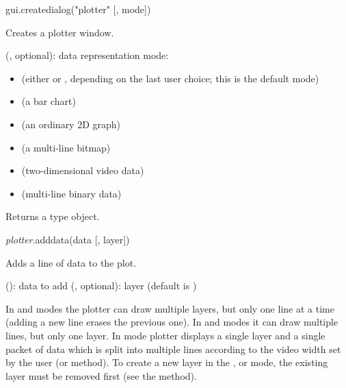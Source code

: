\documentclass[a4paper,12pt,twoside,extrafontsizes]{memoir}
\begin{document}

\begin{luafuncprototype}
gui.createdialog("plotter" [, mode])
\end{luafuncprototype}

\begin{funcdescr}
	Creates a plotter window.
\end{funcdescr}

\begin{funcparams}
	 (, optional): data representation mode:
	\begin{itemize}
		\item {} (either  or , depending on the last user choice; this is the default mode)
		\item {} (a bar chart)
		\item {} (an ordinary 2D graph)
		\item {} (a multi-line bitmap)
		\item {} (two-dimensional video data)
		\item {} (multi-line binary data)
	\end{itemize}
\end{funcparams}

\begin{funcret}
	Returns a  type object.
\end{funcret}


\begin{luafuncprototype}
\emph{plotter}.adddata(data [, layer])
\end{luafuncprototype}

\begin{funcdescr}
	Adds a line of data to the plot.
\end{funcdescr}

\begin{funcparams}
	 (): data to add
	 (, optional): layer (default is )
\end{funcparams}

\begin{funcremarks}
	In  and  modes the plotter can draw multiple layers, but only one line at a time (adding a new line erases the previous one). In  and  modes it can draw multiple lines, but only one layer. In  mode plotter displays a single layer and a single packet of data which is split into multiple lines according to the video width set by the user (or  method). To create a new layer in the ,  or  mode, the existing layer must be removed first (see the  method).
\end{funcremarks}
\end{document}
